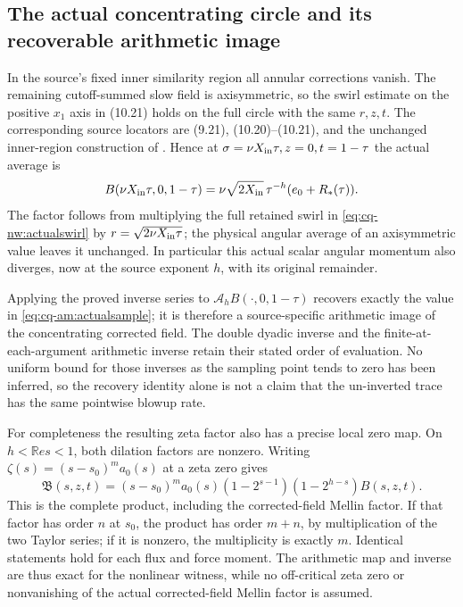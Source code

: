 \subsection{The actual concentrating circle and its recoverable arithmetic image}

In the source's fixed inner similarity region all annular corrections
vanish. The remaining cutoff-summed slow field is axisymmetric, so
the swirl estimate on the positive $x_1$ axis in (10.21) holds on
the full circle with the same $r,z,t$. The corresponding source locators are (9.21), (10.20)--(10.21), and the unchanged inner-region construction of \cite{cqNS2026}. Hence at
$\sigma=\nu X_{\rm in}\tau,z=0,t=1-\tau$ the actual average is
\begin{equation}
 B(\nu X_{\rm in}\tau,0,1-\tau)
   =\nu\sqrt{2X_{\rm in}}\,\tau^{-h}(e_0+R_*(\tau)).
 \label{eq:cq-am:actualsample}
\end{equation}
The factor follows from multiplying the full retained swirl in
\eqref{eq:cq-nw:actualswirl} by $r=\sqrt{2\nu X_{\rm in}\tau}$;
the physical angular average of an axisymmetric value leaves it
unchanged. In particular this actual scalar angular momentum also
diverges, now at the source exponent $h$, with its original remainder.

Applying the proved inverse series to
$\mathcal A_hB(\cdot,0,1-\tau)$ recovers exactly the value in
\eqref{eq:cq-am:actualsample}; it is therefore a source-specific arithmetic
image of the concentrating corrected field. The double dyadic inverse
and the finite-at-each-argument arithmetic inverse retain their stated
order of evaluation. No uniform bound for those inverses as the
sampling point tends to zero has been inferred, so the recovery
identity alone is not a claim that the un-inverted trace has the same
pointwise blowup rate.

For completeness the resulting zeta factor also has a precise local
zero map. On $h<\mathbb Re s<1$, both dilation factors are nonzero.
Writing $\zeta(s)=(s-s_0)^m a_0(s)$ at a zeta zero gives
\[
 \mathfrak B(s,z,t)=(s-s_0)^m a_0(s)
       (1-2^{s-1})(1-2^{h-s})\widehat B(s,z,t).
\]
This is the complete product, including the corrected-field Mellin
factor. If that factor has order $n$ at $s_0$, the product has order
$m+n$, by multiplication of the two Taylor series; if it is nonzero,
the multiplicity is exactly $m$. Identical statements hold for each
flux and force moment. The arithmetic map and inverse are thus exact
for the nonlinear witness, while no off-critical zeta zero or
nonvanishing of the actual corrected-field Mellin factor is assumed.

